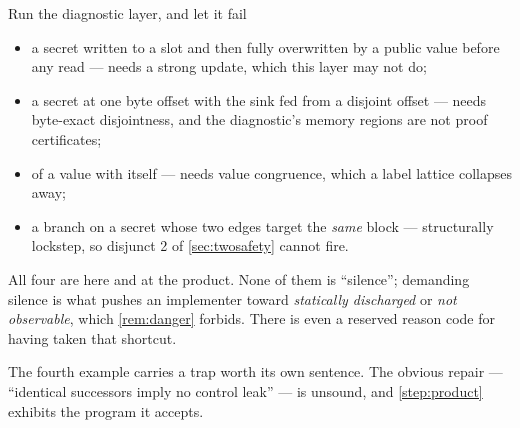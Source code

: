 \begin{step}{Run the diagnostic layer, and let it fail}{%
}
\begin{itemize}[nosep,leftmargin=1.4em]
\item a secret written to a slot and then fully overwritten by a public value
      before any read --- needs a strong update, which this layer may not do;
\item a secret at one byte offset with the sink fed from a disjoint offset ---
      needs byte-exact disjointness, and the diagnostic's memory regions are not
      proof certificates;
\item {} of a value with itself --- needs value congruence, which a
      label lattice collapses away;
\item a branch on a secret whose two edges target the \emph{same} block ---
      structurally lockstep, so disjunct 2 of \cref{sec:twosafety} cannot fire.
\end{itemize}

All four are \RelReq{} here and \Proved{} at the product. None of them is
``silence''; demanding silence is what pushes an implementer toward
\emph{statically discharged} or \emph{not observable}, which \cref{rem:danger}
forbids. There is even a reserved reason code for having taken that shortcut.

The fourth example carries a trap worth its own sentence. The obvious repair ---
``identical successors imply no control leak'' --- is unsound, and
\cref{step:product} exhibits the program it accepts.
\end{step}

